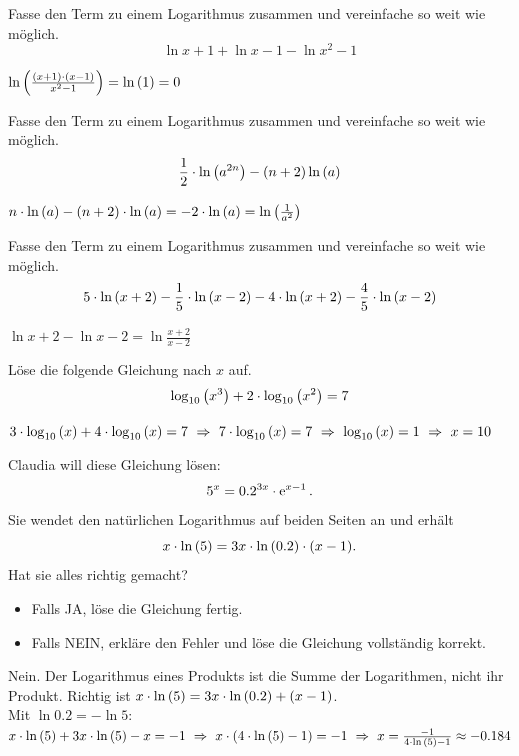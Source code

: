 \documentclass[11pt]{exam}
\begin{document}
\begin{questions}
\question[2]
Fasse den Term zu einem Logarithmus zusammen und vereinfache so weit wie möglich.
\[\ln{x+1}+\ln{x-1}-\ln{x^2-1}\]
{\begin{solution}
		$\ln{\frac{(x+1)\*(x-1)}{x^2-1}}=\ln{1}=0$
\end{solution}}
{}

\question[2]
Fasse den Term zu einem Logarithmus zusammen und vereinfache so weit wie möglich.
\[\frac{1}{2}\*\ln{a^{2n}}-(n+2)\ln{a}\]
{\begin{solution}
		$n\*\ln{a}-(n+2)\*\ln{a}=-2\*\ln{a}=\ln{\frac{1}{a^2}}$
\end{solution}}
{}

\question[2]
Fasse den Term zu einem Logarithmus zusammen und vereinfache so weit wie möglich. \[5\*\ln{x+2}-\frac{1}{5}\*\ln{x-2}-4\*\ln{x+2}-\frac{4}{5}\*\ln{x-2}\]
{\begin{solution}
		$\ln{x+2}-\ln{x-2}=\ln{\frac{x+2}{x-2}}$
\end{solution}}
{}


\question[4]
Löse die folgende Gleichung nach $x$ auf. \[\log{10}{x^3}+2\*\log{10}{x^2}=7\]
{\begin{solution}
		$3\*\log{10}{x}+4\*\log{10}{x}=7\ \Rightarrow\ 7\*\log{10}{x}=7\ \Rightarrow\ \log{10}{x}=1\ \Rightarrow\ x=10$
\end{solution}}
{}


\question[4]
Claudia will diese Gleichung lösen: \[5^x=0.2^{3x}\cdot\operatorname{\operatorname{e}}^{x-1}.\] Sie wendet den natürlichen Logarithmus auf beiden Seiten an und erhält \[x\*\ln{5}=3x\*\ln{0.2}\*(x-1).\] Hat sie alles richtig gemacht?
\begin{itemize}
	\item Falls JA, löse die Gleichung fertig.
	\item Falls NEIN, erkläre den Fehler und löse die Gleichung vollständig korrekt.
\end{itemize}
{\begin{solution}
		Nein. Der Logarithmus eines Produkts ist die Summe der Logarithmen, nicht ihr Produkt. Richtig ist $x\*\ln{5}=3x\*\ln{0.2}+(x-1)$.\\
		Mit $\ln{0.2}=-\ln{5}$: $x\*\ln{5}+3x\*\ln{5}-x=-1\ \Rightarrow\ x\*\left(4\*\ln{5}-1\right)=-1\ \Rightarrow\ x=\frac{-1}{4\*\ln{5}-1}\approx-0.184$
\end{solution}}
{}



\end{questions}
\end{document}
